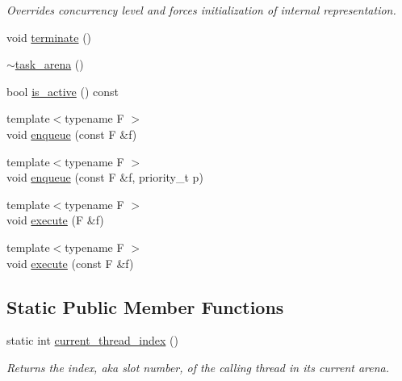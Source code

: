 \begin{DoxyCompactItemize}
\begin{DoxyCompactList}\small\item\em Overrides concurrency level and forces initialization of internal representation. \end{DoxyCompactList}\item 
void \hyperlink{classtbb_1_1interface7_1_1task__arena_aecb3eedeacfe8469a91c17525dae7fc9}{terminate} ()
\item 
\hyperlink{classtbb_1_1interface7_1_1task__arena_a9ff5a35a219953a4f3d99b833fa5f683}{$\sim$task\+\_\+arena} ()
\item 
bool \hyperlink{classtbb_1_1interface7_1_1task__arena_ad85856cefa30d42155a2b122b03efd8c}{is\+\_\+active} () const 
\item 
{\footnotesize template$<$typename F $>$ }\\void \hyperlink{classtbb_1_1interface7_1_1task__arena_a8034275ed2fffa68f70484043b90d406}{enqueue} (const F \&f)
\item 
{\footnotesize template$<$typename F $>$ }\\void \hyperlink{classtbb_1_1interface7_1_1task__arena_a9a04ab4afb2d74b0317618f59ab49be7}{enqueue} (const F \&f, priority\+\_\+t p)
\item 
{\footnotesize template$<$typename F $>$ }\\void \hyperlink{classtbb_1_1interface7_1_1task__arena_af0c96f325b59d567b4c720f2830adde8}{execute} (F \&f)
\item 
{\footnotesize template$<$typename F $>$ }\\void \hyperlink{classtbb_1_1interface7_1_1task__arena_ab8442c8e9e3e678349409e08cabc7ae2}{execute} (const F \&f)
\end{DoxyCompactItemize}
\subsection*{Static Public Member Functions}
\begin{DoxyCompactItemize}
\item 
\hypertarget{classtbb_1_1interface7_1_1task__arena_af695a8aa3d2a4f498067c662e287dd8f}{}static int \hyperlink{classtbb_1_1interface7_1_1task__arena_af695a8aa3d2a4f498067c662e287dd8f}{current\+\_\+thread\+\_\+index} ()\label{classtbb_1_1interface7_1_1task__arena_af695a8aa3d2a4f498067c662e287dd8f}

\begin{DoxyCompactList}\small\item\em Returns the index, aka slot number, of the calling thread in its current arena. \end{DoxyCompactList}\end{DoxyCompactItemize}

